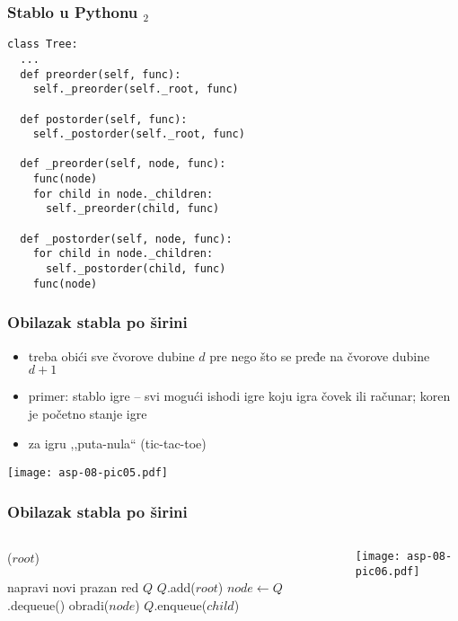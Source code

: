 \documentclass[compress]{beamer}
\begin{document}
\begin{frame}
  \frametitle{Stablo u Pythonu $_2$}
\begin{verbatim}
class Tree:
  ...
  def preorder(self, func):
    self._preorder(self._root, func)
    
  def postorder(self, func):
    self._postorder(self._root, func)
    
  def _preorder(self, node, func):
    func(node)
    for child in node._children:
      self._preorder(child, func)
  
  def _postorder(self, node, func):
    for child in node._children:
      self._postorder(child, func)
    func(node)
\end{verbatim}
\end{frame}

\begin{frame}[fragile]
\frametitle{Obilazak stabla po širini}
\begin{itemize}
  \item treba obići sve čvorove dubine $d$ pre nego što se pređe na čvorove dubine $d + 1$
  \item primer: stablo igre -- svi mogući ishodi igre koju igra čovek ili računar; koren je početno stanje igre
  \item za igru ,,puta-nula`` (tic-tac-toe)
\end{itemize}
\begin{center}
  \texttt{[image: asp-08-pic05.pdf]}
\end{center}
\end{frame}

\begin{frame}[fragile]
\frametitle{Obilazak stabla po širini}
\begin{columns}
  \begin{column}[c]{6cm}
    ($root$)
    \begin{algorithmic}
    \STATE napravi novi prazan red $Q$
    \STATE $Q$.add($root$)
      \STATE $node \leftarrow Q$.dequeue()
      \STATE obradi($node$)
        \STATE $Q$.enqueue($child$)
      \ENDFOR  
    \ENDWHILE
    \end{algorithmic}
  \end{column}
  \begin{column}[c]{5cm}
    \begin{center}
      \texttt{[image: asp-08-pic06.pdf]}
    \end{center}
  \end{column}
\end{columns}
\end{frame}
\end{document}
